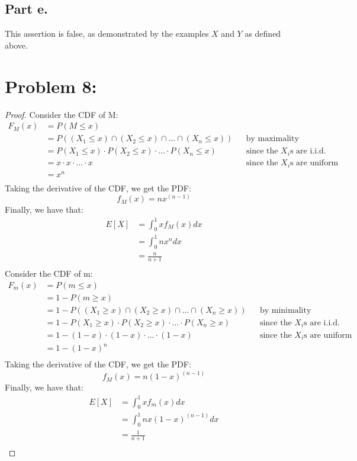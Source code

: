 \documentclass{article}
\begin{document}
\subsection*{Part e.}

This assertion is false, as demonstrated by the examples $X$ and $Y$ as defined above.

\section*{Problem 8:}
\begin{proof}
Consider the CDF of M:
\begin{align*}
F_M(x) &= P(M \leq x) \\
&= P((X_1 \leq x) \cap (X_2 \leq x) \cap ... \cap (X_n \leq x)) &&\text{by maximality of M} \\ 
&= P(X_1 \leq x) \cdot P(X_2 \leq x) \cdot ... \cdot P(X_n \leq x) &&\text{since the $X_i$s are i.i.d.} \\
&= x \cdot x \cdot ... \cdot x &&\text{since the $X_i$s are uniform} \\
&= x^n \\
\end{align*}
Taking the derivative of the CDF, we get the PDF:
$$f_M(x) = nx^{(n - 1)}$$
Finally, we have that:
\begin{align*}
E[X] &= \int_0^1 xf_M(x) dx \\
&= \int_0^1  nx^n dx \\
&= \frac{n}{n + 1} \\
\end{align*}
Consider the CDF of m:
\begin{align*}
F_m(x) &= P(m \leq x) \\
&= 1 - P(m \geq x) \\
&= 1 - P((X_1 \geq x) \cap (X_2 \geq x) \cap ... \cap (X_n \geq x)) &&\text{by minimality of m} \\
&= 1 - P(X_1 \geq x) \cdot P(X_2 \geq x) \cdot ... \cdot P(X_n \geq x) &&\text{since the $X_i$s are i.i.d.} \\
&= 1 - (1 - x) \cdot (1 - x) \cdot ... \cdot (1 - x) &&\text{since the $X_i$s are uniform} \\
&= 1 - (1 - x)^n \\
\end{align*}
Taking the derivative of the CDF, we get the PDF:
$$f_M(x) = n(1 - x)^{(n - 1)}$$
Finally, we have that:
\begin{align*}
E[X] &= \int_0^1 xf_m(x) dx \\
&= \int_0^1  nx(1 - x)^{(n - 1)} dx \\
&= \frac{1}{n + 1} \\
\end{align*}

\end{proof}
\end{document}
